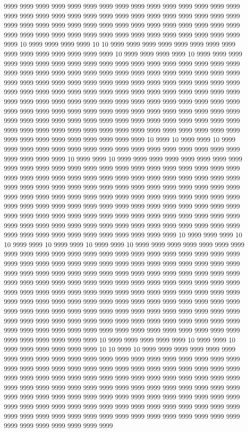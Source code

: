 9999 9999 9999 9999 9999 9999 9999 9999 9999 9999 9999 9999 9999 9999 9999 9999 9999 9999 9999 9999 9999 9999 9999 9999 9999 9999 9999 9999 9999 9999 9999 9999 9999 9999 9999 9999 9999 9999 9999 9999 9999 9999 9999 9999 9999 9999 9999 9999 9999 9999 9999 9999 9999 9999 9999 9999 9999 9999 9999 9999 9999 10 9999 9999 9999 9999 10 10 9999 9999 9999 9999 9999 9999 9999 9999 9999 9999 9999 9999 9999 9999 9999 10 9999 9999 9999 9999 10 9999 9999 9999 9999 9999 9999 9999 9999 9999 9999 9999 9999 9999 9999 9999 9999 9999 9999 9999 9999 9999 9999 9999 9999 9999 9999 9999 9999 9999 9999 9999 9999 9999 9999 9999 9999 9999 9999 9999 9999 9999 9999 9999 9999 9999 9999 9999 9999 9999 9999 9999 9999 9999 9999 9999 9999 9999 9999 9999 9999 9999 9999 9999 9999 9999 9999 9999 9999 9999 9999 9999 9999 9999 9999 9999 9999 9999 9999 9999 9999 9999 9999 9999 9999 9999 9999 9999 9999 9999 9999 9999 9999 9999 9999 9999 9999 9999 9999 9999 9999 9999 9999 9999 9999 9999 9999 9999 9999 9999 9999 9999 9999 9999 9999 9999 9999 9999 9999 9999 9999 9999 9999 9999 9999 9999 9999 9999 9999 9999 9999 9999 9999 10 9999 10 9999 9999 10 9999 9999 9999 9999 9999 9999 9999 9999 9999 9999 9999 9999 9999 9999 9999 9999 9999 9999 9999 9999 10 9999 9999 10 9999 9999 9999 9999 9999 9999 9999 9999 9999 9999 9999 9999 9999 9999 9999 9999 9999 9999 9999 9999 9999 9999 9999 9999 9999 9999 9999 9999 9999 9999 9999 9999 9999 9999 9999 9999 9999 9999 9999 9999 9999 9999 9999 9999 9999 9999 9999 9999 9999 9999 9999 9999 9999 9999 9999 9999 9999 9999 9999 9999 9999 9999 9999 9999 9999 9999 9999 9999 9999 9999 9999 9999 9999 9999 9999 9999 9999 9999 9999 9999 9999 9999 9999 9999 9999 9999 9999 9999 9999 9999 9999 9999 9999 9999 9999 9999 9999 9999 9999 9999 9999 9999 9999 9999 9999 9999 9999 9999 9999 9999 9999 9999 9999 9999 9999 9999 9999 9999 9999 9999 9999 9999 9999 9999 10 9999 9999 9999 10 10 9999 9999 10 9999 9999 10 9999 9999 10 9999 9999 9999 9999 9999 9999 9999 9999 9999 9999 9999 9999 9999 9999 9999 9999 9999 9999 9999 9999 9999 9999 9999 9999 9999 9999 9999 9999 9999 9999 9999 9999 9999 9999 9999 9999 9999 9999 9999 9999 9999 9999 9999 9999 9999 9999 9999 9999 9999 9999 9999 9999 9999 9999 9999 9999 9999 9999 9999 9999 9999 9999 9999 9999 9999 9999 9999 9999 9999 9999 9999 9999 9999 9999 9999 9999 9999 9999 9999 9999 9999 9999 9999 9999 9999 9999 9999 9999 9999 9999 9999 9999 9999 9999 9999 9999 9999 9999 9999 9999 9999 9999 9999 9999 9999 9999 9999 9999 9999 9999 9999 9999 9999 9999 9999 9999 9999 9999 9999 9999 9999 9999 9999 9999 9999 9999 9999 9999 9999 9999 9999 9999 9999 9999 9999 9999 9999 9999 9999 9999 9999 9999 9999 9999 9999 9999 9999 9999 10 9999 9999 9999 9999 9999 10 9999 9999 10 9999 9999 9999 9999 9999 9999 10 10 9999 10 9999 9999 9999 9999 9999 9999 9999 9999 9999 9999 9999 9999 9999 9999 9999 9999 9999 9999 9999 9999 9999 9999 9999 9999 9999 9999 9999 9999 9999 9999 9999 9999 9999 9999 9999 9999 9999 9999 9999 9999 9999 9999 9999 9999 9999 9999 9999 9999 9999 9999 9999 9999 9999 9999 9999 9999 9999 9999 9999 9999 9999 9999 9999 9999 9999 9999 9999 9999 9999 9999 9999 9999 9999 9999 9999 9999 9999 9999 9999 9999 9999 9999 9999 9999 9999 9999 9999 9999 9999 9999 9999 9999 9999 9999 9999 9999 9999 9999 9999 9999 9999 9999 9999 9999 9999 9999 9999 9999 9999 9999 9999 9999 9999 9999 9999 9999 9999 9999 